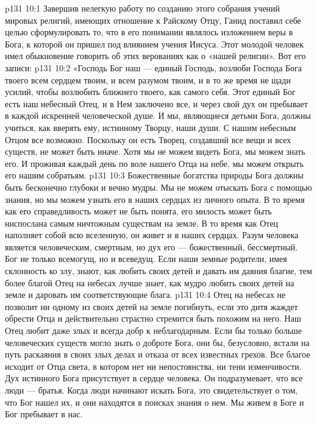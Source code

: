 \vs p131 10:1 Завершив нелегкую работу по созданию этого собрания учений мировых религий, имеющих отношение к Райскому Отцу, Ганид поставил себе целью сформулировать то, что в его понимании являлось изложением веры в Бога, к которой он пришел под влиянием учения Иисуса. Этот молодой человек имел обыкновение говорить об этих верованиях как о «нашей религии». Вот его записи:
\vs p131 10:2 \pc «Господь Бог наш --- единый Господь, возлюби Господа Бога твоего всем сердцем твоим, и всем разумом твоим, и в то же время не щади усилий, чтобы возлюбить ближнего твоего, как самого себя. Этот единый Бог есть наш небесный Отец, и в Нем заключено все, и через свой дух он пребывает в каждой искренней человеческой душе. И мы, являющиеся детьми Бога, должны учиться, как вверять ему, истинному Творцу, наши души. С нашим небесным Отцом все возможно. Поскольку он есть Творец, создавший все вещи и всех существ, не может быть иначе. Хотя мы не можем видеть Бога, мы можем знать его. И проживая каждый день по воле нашего Отца на небе, мы можем открыть его нашим собратьям.
\vs p131 10:3 Божественные богатства природы Бога должны быть бесконечно глубоки и вечно мудры. Мы не можем отыскать Бога с помощью знания, но мы можем узнать его в наших сердцах из личного опыта. В то время как его справедливость может не быть понята, его милость может быть ниспослана самым ничтожным существам на земле. В то время как Отец наполняет собой всю вселенную, он живет и в наших сердцах. Разум человека является человеческим, смертным, но дух его --- божественный, бессмертный. Бог не только всемогущ, но и всеведущ. Если наши земные родители, имея склонность ко злу, знают, как любить своих детей и давать им даяния благие, тем более благой Отец на небесах лучше знает, как мудро любить своих детей на земле и даровать им соответствующие блага.
\vs p131 10:4 Отец на небесах не позволит ни одному из своих детей на земле погибнуть, если это дитя жаждет обрести Отца и действительно страстно стремится быть похожим на него. Наш Отец любит даже злых и всегда добр к неблагодарным. Если бы только больше человеческих существ могло знать о доброте Бога, они бы, безусловно, встали на путь раскаяния в своих злых делах и отказа от всех известных грехов. Все благое исходит от Отца света, в котором нет ни непостоянства, ни тени изменчивости. Дух истинного Бога присутствует в сердце человека. Он подразумевает, что все люди --- братья. Когда люди начинают искать Бога, это свидетельствует о том, что Бог нашел их, и они находятся в поисках знания о нем. Мы живем в Боге и Бог пребывает в нас.
